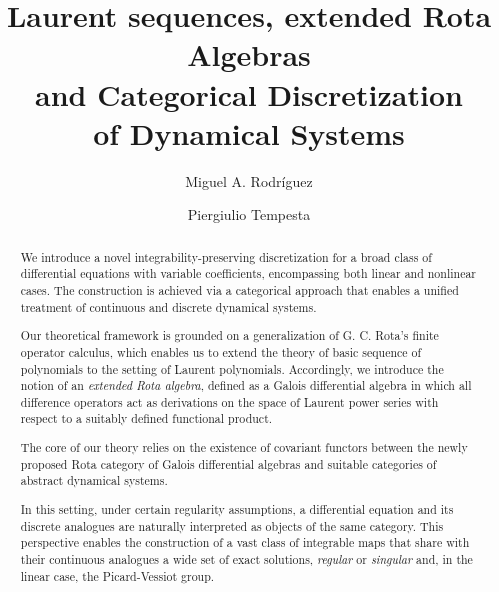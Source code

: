 \documentclass[10pt]{amsart}
\numberwithin{equation}{section}
\theoremstyle{definition}
\begin{document}
\title[Categorical Discretization of Dynamical Systems via Rota  Algebras]{Laurent sequences, extended Rota Algebras \\ and Categorical Discretization \\ of Dynamical Systems }


\author{Miguel A. Rodr\'iguez}
\address{Departamento de F\'{\i}sica Te\'{o}rica, Facultad de F\'{\i}sicas, Universidad Complutense de Madrid, 28040 -- Madrid, Spain}

\author{Piergiulio Tempesta}
\address{Instituto de Ciencias Matem\'aticas (CSIC-UAM-UCM-UC3M), C/ Nicol\'as Cabrera, No 13--15, 28049 Madrid, Spain}
\address{Departamento de F\'{\i}sica Te\'{o}rica, Facultad de F\'{\i}sicas, Universidad Complutense de Madrid, 28040 -- Madrid, Spain}








\begin{abstract}
We introduce a novel integrability-preserving discretization for a broad
class of differential equations with variable coefficients, encompassing
both linear and nonlinear cases. The construction is achieved via a categorical
approach that enables a unified treatment of continuous and discrete dynamical
systems.

Our theoretical framework is grounded on a generalization of G. C.
Rota's finite operator calculus, which enables us to extend the theory
of basic sequence of polynomials to the setting of Laurent polynomials.
Accordingly, we introduce the notion of an
\textit{extended Rota algebra}, defined as a Galois differential algebra
in which all difference operators act as derivations on the space of Laurent
power series with respect to a suitably defined functional product.

The core of our theory relies on the existence of covariant functors between
the newly proposed Rota category of Galois differential algebras and suitable
categories of abstract dynamical systems.

In this setting, under certain regularity assumptions, a differential equation
and its discrete analogues are naturally interpreted as objects of the
same category. This perspective enables the construction of a vast class
of integrable maps that share with their continuous analogues a wide set
of exact solutions, \textit{regular} or \textit{singular} and, in the linear
case, the Picard-Vessiot group.
\end{abstract}
\end{document}
